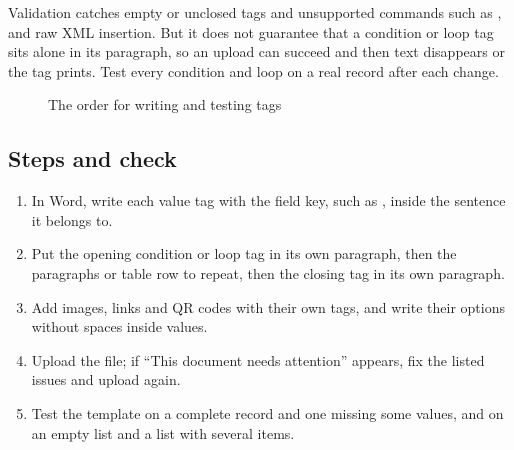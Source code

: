 \begin{rcwarn}
Validation catches empty or unclosed tags and unsupported commands such as ,  and raw XML insertion. But it does not guarantee that a condition or loop tag sits alone in its paragraph, so an upload can succeed and then text disappears or the tag prints. Test every condition and loop on a real record after each change.
\end{rcwarn}

\begin{figure}[H]
\centering
{}
\rclegend
\caption{The order for writing and testing tags}
\label{fig:builder-docx-tags-flow}
\end{figure}

\subsection{Steps and check}
\begin{enumerate}
\item In Word, write each value tag with the field key, such as , inside the sentence it belongs to.
\item Put the opening condition or loop tag in its own paragraph, then the paragraphs or table row to repeat, then the closing tag in its own paragraph.
\item Add images, links and QR codes with their own tags, and write their options without spaces inside values.
\item Upload the file; if “This document needs attention” appears, fix the listed issues and upload again.
\item Test the template on a complete record and one missing some values, and on an empty list and a list with several items.
\end{enumerate}

